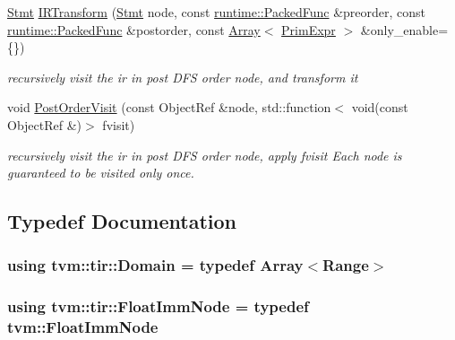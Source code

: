 \begin{DoxyCompactItemize}
\item 
\hyperlink{classtvm_1_1tir_1_1Stmt}{Stmt} \hyperlink{namespacetvm_1_1tir_a1217dd1b57e84b5901cf755251b9e164}{I\+R\+Transform} (\hyperlink{classtvm_1_1tir_1_1Stmt}{Stmt} node, const \hyperlink{classtvm_1_1runtime_1_1PackedFunc}{runtime\+::\+Packed\+Func} \&preorder, const \hyperlink{classtvm_1_1runtime_1_1PackedFunc}{runtime\+::\+Packed\+Func} \&postorder, const \hyperlink{classtvm_1_1Array}{Array}$<$ \hyperlink{classtvm_1_1PrimExpr}{Prim\+Expr} $>$ \&only\+\_\+enable=\{\})
\begin{DoxyCompactList}\small\item\em recursively visit the ir in post D\+FS order node, and transform it \end{DoxyCompactList}\item 
void \hyperlink{namespacetvm_1_1tir_a4b5067fa233d111c9db9cc402ed599c3}{Post\+Order\+Visit} (const Object\+Ref \&node, std\+::function$<$ void(const Object\+Ref \&)$>$ fvisit)
\begin{DoxyCompactList}\small\item\em recursively visit the ir in post D\+FS order node, apply fvisit Each node is guaranteed to be visited only once. \end{DoxyCompactList}\end{DoxyCompactItemize}


\subsection{Typedef Documentation}
\subsubsection[{\texorpdfstring{Domain}{Domain}}]{\setlength{\rightskip}{0pt plus 5cm}using {\bf tvm\+::tir\+::\+Domain} = typedef {\bf Array}$<${\bf Range}$>$}\hypertarget{namespacetvm_1_1tir_aa177c432dd27540d34b22c05559324ab}{}\label{namespacetvm_1_1tir_aa177c432dd27540d34b22c05559324ab}
\subsubsection[{\texorpdfstring{Float\+Imm\+Node}{FloatImmNode}}]{\setlength{\rightskip}{0pt plus 5cm}using {\bf tvm\+::tir\+::\+Float\+Imm\+Node} = typedef {\bf tvm\+::\+Float\+Imm\+Node}}\hypertarget{namespacetvm_1_1tir_adb123be81447d2871f4c716ce2d1dc00}{}\label{namespacetvm_1_1tir_adb123be81447d2871f4c716ce2d1dc00}
